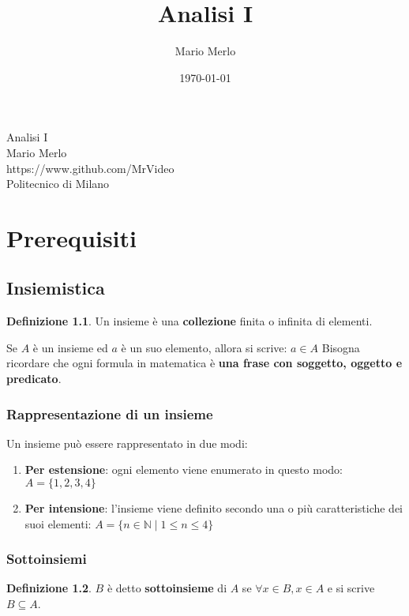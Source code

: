 \documentclass[a4paper, 12pt]{report}
\title{Analisi I}
\author{Mario Merlo}
\date{\today}
\theoremstyle{definition}
\newtheorem{definition}{Definizione}[chapter]
\theoremstyle{remark}
\theoremstyle{plain}
\newcommand{\N}{\mathbb{N}}
\begin{document}
\begin{titlepage}
    \begin{center}
        \vspace*{5cm}
        \Huge{Analisi I}\\[1cm]
        \Large{Mario Merlo}\\
        \Large{https://www.github.com/MrVideo}\\
        \Large{Politecnico di Milano}\\[7,5cm]
    \end{center}
    \doclicenseThis
\end{titlepage}

\chapter{Prerequisiti}

\section{Insiemistica}

\begin{definition}
    Un insieme è una \textbf{collezione} finita o infinita di elementi.
\end{definition}

Se $A$ è un insieme ed $a$ è un suo elemento, allora si scrive: $a \in A$
Bisogna ricordare che ogni formula in matematica è \textbf{una frase con soggetto, oggetto e predicato}.

\subsection{Rappresentazione di un insieme}

Un insieme può essere rappresentato in due modi:
\begin{enumerate}
    \item \textbf{Per estensione}: ogni elemento viene enumerato in questo modo: $A = \{1, 2, 3, 4\}$
    \item \textbf{Per intensione}: l'insieme viene definito secondo una o più caratteristiche dei suoi elementi: $A = \{n \in \N \mid 1 \leq n \leq 4\}$
\end{enumerate}

\subsection{Sottoinsiemi}

\begin{definition}
    $B$ è detto \textbf{sottoinsieme} di $A$ se $\forall x \in B, x \in A$ e si scrive $B \subseteq A$.
\end{definition}
\end{document}
